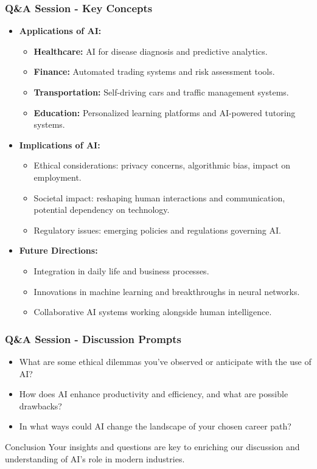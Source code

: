 \documentclass[aspectratio=169]{beamer}
\begin{document}
\begin{frame}[fragile]
    \frametitle{Q\&A Session - Key Concepts}
    \begin{itemize}
        \item \textbf{Applications of AI:}
            \begin{itemize}
                \item \textbf{Healthcare:} AI for disease diagnosis and predictive analytics.
                \item \textbf{Finance:} Automated trading systems and risk assessment tools.
                \item \textbf{Transportation:} Self-driving cars and traffic management systems.
                \item \textbf{Education:} Personalized learning platforms and AI-powered tutoring systems.
            \end{itemize}
        \item \textbf{Implications of AI:}
            \begin{itemize}
                \item Ethical considerations: privacy concerns, algorithmic bias, impact on employment.
                \item Societal impact: reshaping human interactions and communication, potential dependency on technology.
                \item Regulatory issues: emerging policies and regulations governing AI.
            \end{itemize}
        \item \textbf{Future Directions:}
            \begin{itemize}
                \item Integration in daily life and business processes.
                \item Innovations in machine learning and breakthroughs in neural networks.
                \item Collaborative AI systems working alongside human intelligence.
            \end{itemize}
    \end{itemize}
\end{frame}

\begin{frame}[fragile]
    \frametitle{Q\&A Session - Discussion Prompts}
    \begin{itemize}
        \item What are some ethical dilemmas you've observed or anticipate with the use of AI?
        \item How does AI enhance productivity and efficiency, and what are possible drawbacks?
        \item In what ways could AI change the landscape of your chosen career path?
    \end{itemize}
    \begin{block}{Conclusion}
        Your insights and questions are key to enriching our discussion and understanding of AI's role in modern industries.
    \end{block}
\end{frame}
\end{document}
